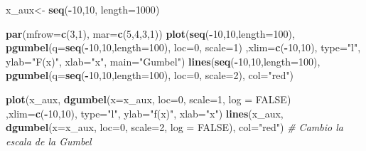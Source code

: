 \documentclass[
  12pt]{article}
\newenvironment{Shaded}{\begin{snugshade}}{\end{snugshade}}
\newcommand{\AttributeTok}[1]{\textcolor[rgb]{0.13,0.29,0.53}{#1}}
\newcommand{\CommentTok}[1]{\textcolor[rgb]{0.56,0.35,0.01}{\textit{#1}}}
\newcommand{\ConstantTok}[1]{\textcolor[rgb]{0.56,0.35,0.01}{#1}}
\newcommand{\DecValTok}[1]{\textcolor[rgb]{0.00,0.00,0.81}{#1}}
\newcommand{\FunctionTok}[1]{\textcolor[rgb]{0.13,0.29,0.53}{\textbf{#1}}}
\newcommand{\NormalTok}[1]{#1}
\newcommand{\OtherTok}[1]{\textcolor[rgb]{0.56,0.35,0.01}{#1}}
\newcommand{\SpecialCharTok}[1]{\textcolor[rgb]{0.81,0.36,0.00}{\textbf{#1}}}
\newcommand{\StringTok}[1]{\textcolor[rgb]{0.31,0.60,0.02}{#1}}
\begin{document}
\begin{Shaded}
\begin{Highlighting}[]
\NormalTok{x\_aux}\OtherTok{\textless{}{-}} \FunctionTok{seq}\NormalTok{(}\SpecialCharTok{{-}}\DecValTok{10}\NormalTok{,}\DecValTok{10}\NormalTok{, }\AttributeTok{length=}\DecValTok{1000}\NormalTok{)}

\FunctionTok{par}\NormalTok{(}\AttributeTok{mfrow=}\FunctionTok{c}\NormalTok{(}\DecValTok{3}\NormalTok{,}\DecValTok{1}\NormalTok{), }\AttributeTok{mar=}\FunctionTok{c}\NormalTok{(}\DecValTok{5}\NormalTok{,}\DecValTok{4}\NormalTok{,}\DecValTok{3}\NormalTok{,}\DecValTok{1}\NormalTok{))}
\FunctionTok{plot}\NormalTok{(}\FunctionTok{seq}\NormalTok{(}\SpecialCharTok{{-}}\DecValTok{10}\NormalTok{,}\DecValTok{10}\NormalTok{,}\AttributeTok{length=}\DecValTok{100}\NormalTok{), }\FunctionTok{pgumbel}\NormalTok{(}\AttributeTok{q=}\FunctionTok{seq}\NormalTok{(}\SpecialCharTok{{-}}\DecValTok{10}\NormalTok{,}\DecValTok{10}\NormalTok{,}\AttributeTok{length=}\DecValTok{100}\NormalTok{), }\AttributeTok{loc=}\DecValTok{0}\NormalTok{, }\AttributeTok{scale=}\DecValTok{1}\NormalTok{) ,}\AttributeTok{xlim=}\FunctionTok{c}\NormalTok{(}\SpecialCharTok{{-}}\DecValTok{10}\NormalTok{,}\DecValTok{10}\NormalTok{), }\AttributeTok{type=}\StringTok{"l"}\NormalTok{, }\AttributeTok{ylab=}\StringTok{"F(x)"}\NormalTok{, }\AttributeTok{xlab=}\StringTok{"x"}\NormalTok{, }\AttributeTok{main=}\StringTok{"Gumbel"}\NormalTok{)}
\FunctionTok{lines}\NormalTok{(}\FunctionTok{seq}\NormalTok{(}\SpecialCharTok{{-}}\DecValTok{10}\NormalTok{,}\DecValTok{10}\NormalTok{,}\AttributeTok{length=}\DecValTok{100}\NormalTok{), }\FunctionTok{pgumbel}\NormalTok{(}\AttributeTok{q=}\FunctionTok{seq}\NormalTok{(}\SpecialCharTok{{-}}\DecValTok{10}\NormalTok{,}\DecValTok{10}\NormalTok{,}\AttributeTok{length=}\DecValTok{100}\NormalTok{), }\AttributeTok{loc=}\DecValTok{0}\NormalTok{, }\AttributeTok{scale=}\DecValTok{2}\NormalTok{), }\AttributeTok{col=}\StringTok{"red"}\NormalTok{)}

\FunctionTok{plot}\NormalTok{(x\_aux, }\FunctionTok{dgumbel}\NormalTok{(}\AttributeTok{x=}\NormalTok{x\_aux, }\AttributeTok{loc=}\DecValTok{0}\NormalTok{, }\AttributeTok{scale=}\DecValTok{1}\NormalTok{, }\AttributeTok{log =} \ConstantTok{FALSE}\NormalTok{) ,}\AttributeTok{xlim=}\FunctionTok{c}\NormalTok{(}\SpecialCharTok{{-}}\DecValTok{10}\NormalTok{,}\DecValTok{10}\NormalTok{), }\AttributeTok{type=}\StringTok{"l"}\NormalTok{, }\AttributeTok{ylab=}\StringTok{"f(x)"}\NormalTok{, }\AttributeTok{xlab=}\StringTok{"x"}\NormalTok{)}
\FunctionTok{lines}\NormalTok{(x\_aux, }\FunctionTok{dgumbel}\NormalTok{(}\AttributeTok{x=}\NormalTok{x\_aux, }\AttributeTok{loc=}\DecValTok{0}\NormalTok{, }\AttributeTok{scale=}\DecValTok{2}\NormalTok{, }\AttributeTok{log =} \ConstantTok{FALSE}\NormalTok{), }\AttributeTok{col=}\StringTok{"red"}\NormalTok{) }\CommentTok{\# Cambio la escala de la Gumbel}
\end{Highlighting}
\end{Shaded}
\end{document}
